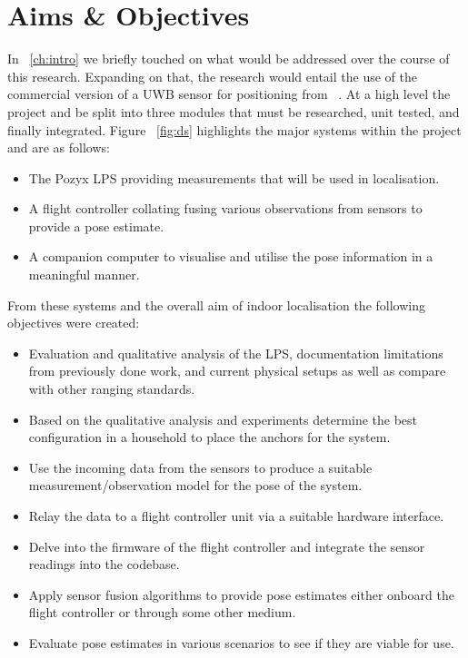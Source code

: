 \section{Aims \& Objectives}\label{sec:aims_objs}

    In ~\ref{ch:intro} we briefly touched on what would be addressed over the course of this research.
Expanding on that, the research would entail the use of the commercial version of a UWB sensor for positioning from ~\cite{pozyx2018pozyx}.
At a high level the project and be split into three modules that must be researched, unit tested, and finally integrated.
Figure ~\ref{fig:ds} highlights the major systems within the project and are as follows:
\begin{itemize}
    \item The Pozyx LPS providing measurements that will be used in localisation.
    \item A flight controller collating fusing various observations from sensors to provide a pose estimate.
    \item A companion computer to visualise and utilise the pose information in a meaningful manner.
\end{itemize}

From these systems and the overall aim of indoor localisation the following objectives were created:
\begin{itemize}
    \item Evaluation and qualitative analysis of the LPS, documentation limitations from previously done work, and current physical setups as well as compare with other ranging standards.
    \item Based on the qualitative analysis and experiments determine the best configuration in a household to place the anchors for the system.
    \item Use the incoming data from the sensors to produce a suitable measurement/observation model for the pose of the system.
    \item Relay the data to a flight controller unit via a suitable hardware interface.
    \item Delve into the firmware of the flight controller and integrate the sensor readings into the codebase.
    \item Apply sensor fusion algorithms to provide pose estimates either onboard the flight controller or through some other medium.
    \item Evaluate pose estimates in various scenarios to see if they are viable for use.
\end{itemize}

